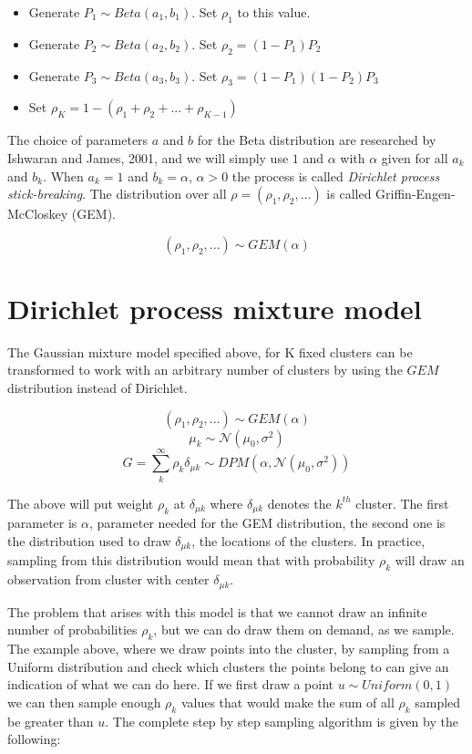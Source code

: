 \documentclass[12pt,a4paper]{article}
\begin{document}
\begin{itemize}
    \item Generate $P_{1} \sim Beta(a_{1}, b_{1})$. Set $\rho_{1}$ to this value.  
    \item Generate $P_{2} \sim Beta(a_{2}, b_{2})$. Set $\rho_{2} = (1 - P_{1})P_{2}$
    \item Generate $P_{3} \sim Beta(a_{3}, b_{3})$. Set $\rho_{3} = (1 - P_{1})(1-P_{2})P_{3}$
    \item Set $\rho_{K} = 1 - (\rho_{1} + \rho_{2} + ... + \rho_{K-1})$
\end{itemize}

The choice of parameters $a$ and $b$ for the Beta distribution are researched by Ishwaran and James, 2001, and we will simply use $1$ and $\alpha$ with $\alpha$ given for all $a_{k}$ and $b_{k}$. 
When $a_{k}=1$ and $b_{k}=\alpha$, $\alpha > 0$ the process is called \textit{Dirichlet process stick-breaking}. The distribution over all $\rho = (\rho_{1}, \rho_{2}, ...)$ is called Griffin-Engen-McCloskey (GEM). 

$$ (\rho_{1}, \rho_{2}, ...) \sim GEM(\alpha)$$

\section{Dirichlet process mixture model}

The Gaussian mixture model specified above, for K fixed clusters can be transformed to work with an arbitrary number of clusters by using the $GEM$ distribution instead of Dirichlet.

$$(\rho_{1}, \rho_{2}, ...) \sim GEM(\alpha)$$
$$\mu_{k} \sim \mathcal{N}(\mu_{0}, \sigma^2)$$
$$ G = \sum_{k}^{\infty}\rho_{k}\delta_{\mu k} \sim DPM(\alpha, \mathcal{N}(\mu_{0}, \sigma^2))$$

The above will put weight $\rho_{k}$ at $\delta_{\mu k}$ where $\delta_{\mu k}$ denotes the $k^{th}$ cluster. The first parameter is $\alpha$, parameter needed for the GEM distribution, the second one is the distribution used to draw $\delta_{\mu k}$, the locations of the clusters. In practice, sampling from this distribution would mean that with probability $\rho_{k}$ will draw an observation from cluster with center $\delta_{\mu k}$.

The problem that arises with this model is that we cannot draw an infinite number of probabilities $\rho_{k}$, but we can do draw them on demand, as we sample. The example above, where we draw points into the cluster, by sampling from a Uniform distribution and check which clusters the points belong to can give an indication of what we can do here. If we first draw a point $u \sim Uniform(0, 1)$ we can then sample enough $\rho_{k}$ values that would make the sum of all $\rho_{k}$ sampled be greater than $u$. The complete step by step sampling algorithm is given by the following:
\end{document}
